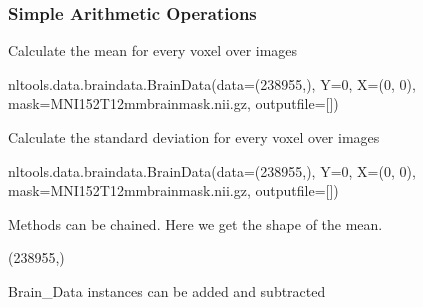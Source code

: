 \documentclass[letterpaper,10pt,english]{sphinxmanual}
\begin{document}
\subsubsection{Simple Arithmetic Operations}
\label{\detokenize{content/Introduction_to_Neuroimaging_Data:simple-arithmetic-operations}}
Calculate the mean for every voxel over images

\begin{sphinxVerbatim}[commandchars=\\\{\}]
\end{sphinxVerbatim}

\begin{sphinxVerbatim}[commandchars=\\\{\}]
nltools.data.brain\PYGZus{}data.Brain\PYGZus{}Data(data=(238955,), Y=0, X=(0, 0), mask=MNI152\PYGZus{}T1\PYGZus{}2mm\PYGZus{}brain\PYGZus{}mask.nii.gz, output\PYGZus{}file=[])
\end{sphinxVerbatim}

Calculate the standard deviation for every voxel over images

\begin{sphinxVerbatim}[commandchars=\\\{\}]
\end{sphinxVerbatim}

\begin{sphinxVerbatim}[commandchars=\\\{\}]
nltools.data.brain\PYGZus{}data.Brain\PYGZus{}Data(data=(238955,), Y=0, X=(0, 0), mask=MNI152\PYGZus{}T1\PYGZus{}2mm\PYGZus{}brain\PYGZus{}mask.nii.gz, output\PYGZus{}file=[])
\end{sphinxVerbatim}

Methods can be chained.  Here we get the shape of the mean.

\begin{sphinxVerbatim}[commandchars=\\\{\}]
\end{sphinxVerbatim}

\begin{sphinxVerbatim}[commandchars=\\\{\}]
(238955,)
\end{sphinxVerbatim}

Brain\_Data instances can be added and subtracted
\end{document}
